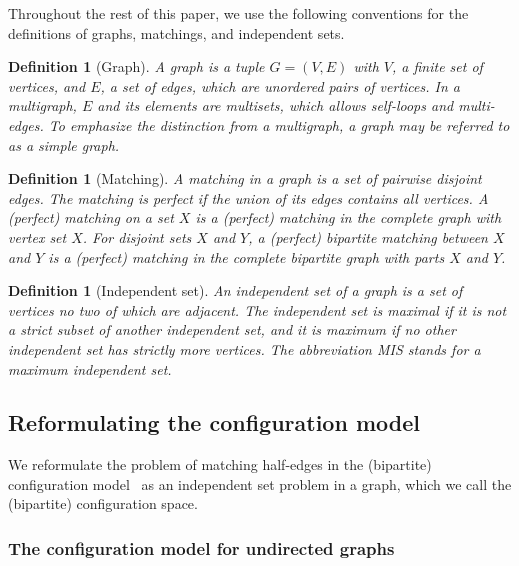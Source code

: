 \documentclass{article}
\theoremstyle{plain}
\theoremstyle{remark}
\theoremstyle{plain}
\newtheorem{definition}[theorem]{Definition}
\numberwithin{equation}{section}
\begin{document}
	Throughout the rest of this paper, we use the following conventions for the definitions of graphs, matchings, and independent sets.
	
	\begin{definition}[Graph]
		A \emph{graph} is a tuple $G=(V,E)$ with $V$, a finite set of vertices, and $E$, a set of edges, which are unordered pairs of vertices. In a \emph{multigraph}, $E$ and its elements are multisets, which allows \emph{self-loops} and \emph{multi-edges}. To emphasize the distinction from a multigraph, a graph may be referred to as a \emph{simple graph}.
	\end{definition}
	
	\begin{definition}[Matching]
		A \emph{matching} in a graph is a set of pairwise disjoint edges. The matching is \emph{perfect} if the union of its edges contains all vertices. A \emph{(perfect) matching on a set $X$} is a (perfect) matching in the complete graph with vertex set $X$. For disjoint sets $X$ and $Y$, a \emph{(perfect) bipartite matching between $X$ and $Y$} is a (perfect) matching in the complete bipartite graph with parts $X$ and $Y$.
	\end{definition}
	
	\begin{definition}[Independent set]
		An \emph{independent set} of a graph is a set of vertices no two of which are adjacent. The independent set is \emph{maximal} if it is not a strict subset of another independent set, and it is \emph{maximum} if no other independent set has strictly more vertices. The abbreviation \emph{MIS} stands for a maximum independent set.
	\end{definition}
	
	\subsection{Reformulating the configuration model}\label{subsection_independent_configuration}
	
	We reformulate the problem of matching half-edges in the (bipartite) configuration model~\cite{BOLLOBAS1980,molloy1995} as an independent set problem in a graph, which we call the (bipartite) configuration space.
	
	\subsubsection{The configuration model for undirected graphs}\label{subsection_independent_simple}
	
\end{document}
